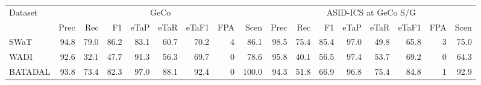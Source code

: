 \begin{tabular}{lrrrrrrrr|rrrrrrrr}
\toprule
Dataset & \multicolumn{8}{c|}{GeCo} & \multicolumn{8}{c}{ASID-ICS at GeCo S/G} \\
 & Prec & Rec & F1 & eTaP & eTaR & eTaF1 & FPA & Scen & Prec & Rec & F1 & eTaP & eTaR & eTaF1 & FPA & Scen \\
\midrule
SWaT & 94.8 & 79.0 & 86.2 & 83.1 & 60.7 & 70.2 & 4 & 86.1 & 98.5 & 75.4 & 85.4 & 97.0 & 49.8 & 65.8 & 3 & 75.0 \\
WADI & 92.6 & 32.1 & 47.7 & 91.3 & 56.3 & 69.7 & 0 & 78.6 & 95.8 & 40.1 & 56.5 & 97.4 & 53.7 & 69.2 & 0 & 64.3 \\
BATADAL & 93.8 & 73.4 & 82.3 & 97.0 & 88.1 & 92.4 & 0 & 100.0 & 94.3 & 51.8 & 66.9 & 96.8 & 75.4 & 84.8 & 1 & 92.9 \\
\bottomrule
\end{tabular}
